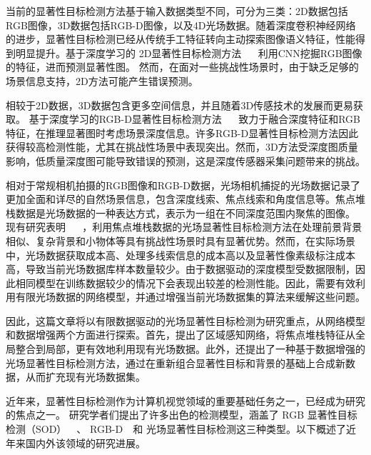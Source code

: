 当前的显著性目标检测方法基于输入数据类型不同，可分为三类：2D数据包括RGB图像，3D数据包括RGB-D图像，以及4D光场数据。随着深度卷积神经网络的进步，显著性目标检测已经从传统手工特征转向主动探索图像语义特征，性能得到明显提升。基于深度学习的
2D显著性目标检测方法
~\cite{feng2019attentive,wu2019cascaded,wu2019mutual,liu2019simple,liu2018picanet,wang2018detect,hou2017deeply,liu2016dhsnet,wang2016saliency}~
利用CNN挖掘RGB图像的特征，进而预测显著性图。
然而，在面对一些挑战性场景时，由于缺乏足够的场景信息支持，2D方法可能产生错误预测。


相较于2D数据，3D数据包含更多空间信息，并且随着3D传感技术的发展而更易获取。
基于深度学习的RGB-D显著性目标检测方法
~\cite{cong2019going,li2020asif,cong2017iterative,chen2019three,piao2019depth,chen2018progressively}~
致力于融合深度特征和RGB特征，在推理显著图时考虑场景深度信息。许多RGB-D显著性目标检测方法因此获得较高检测性能，尤其在挑战性场景中表现突出。然而，3D方法受深度图质量影响，低质量深度图可能导致错误的预测，这是深度传感器采集问题带来的挑战。


相对于常规相机拍摄的RGB图像和RGB-D数据，光场相机捕捉的光场数据记录了更加全面和详尽的自然场景信息，包含深度线索、焦点线索和角度信息等。焦点堆栈数据是光场数据的一种表达方式，表示为一组在不同深度范围内聚焦的图像。
现有研究表明
~\cite{piao2019deep,zhang2020light,wang2019deep,zhang2019memory,zhang2020lfnet,piao2021panet}~
，利用焦点堆栈数据的光场显著性目标检测方法在处理前景背景相似、复杂背景和小物体等具有挑战性场景时具有显著优势。然而，在实际场景中，光场数据获取成本高、处理多线索信息的成本高以及显著性像素级标注成本高，导致当前光场数据库样本数量较少。由于数据驱动的深度模型受数据限制，因此相同模型在训练数据较少的情况下会表现出较差的检测性能。因此，需要有效利用有限光场数据的网络模型，并通过增强当前光场数据集的算法来缓解这些问题。


因此，这篇文章将以有限数据驱动的光场显著性目标检测为研究重点，从网络模型和数据增强两个方面进行探索。首先，提出了区域感知网络，将焦点堆栈特征从全局整合到局部，更有效地利用现有光场数据。此外，还提出了一种基于数据增强的光场显著性目标检测方法，通过在重新组合显著性目标和背景的基础上合成新数据，从而扩充现有光场数据集。  




近年来，显著性目标检测作为计算机视觉领域的重要基础任务之一，已经成为研究的焦点之一。
研究学者们提出了许多出色的检测模型，涵盖了
RGB 显著性目标检测（SOD）~\cite{ ma2021pyramidal, wei2020f3net, zhou2020interactive}~、
RGB-D~\cite{ cong2022cir, ji2021calibrated, liu2021visual}~和
光场显著性目标检测这三种类型。以下概述了近年来国内外该领域的研究进展。







